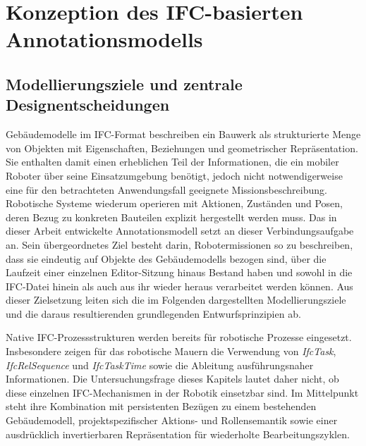 \section{Konzeption des IFC-basierten Annotationsmodells}\label{sec:ifc-annotationsmodell}
\subsection{Modellierungsziele und zentrale Designentscheidungen}\label{subsec:modellierungsziele-annotationsmodell}
Gebäudemodelle im IFC-Format beschreiben ein Bauwerk als strukturierte Menge von Objekten mit
Eigenschaften, Beziehungen und geometrischer Repräsentation. Sie enthalten damit einen erheblichen
Teil der Informationen, die ein mobiler Roboter über seine Einsatzumgebung benötigt, jedoch nicht
notwendigerweise eine für den betrachteten Anwendungsfall geeignete Missionsbeschreibung. Robotische
Systeme wiederum operieren mit Aktionen, Zuständen und Posen, deren Bezug zu konkreten Bauteilen
explizit hergestellt werden muss. Das in dieser Arbeit entwickelte Annotationsmodell setzt an dieser
Verbindungsaufgabe an. Sein übergeordnetes Ziel besteht darin, Robotermissionen
so zu beschreiben, dass sie eindeutig auf Objekte des Gebäudemodells bezogen sind, über die Laufzeit
einer einzelnen Editor-Sitzung hinaus Bestand haben und sowohl in die IFC-Datei hinein als auch aus
ihr wieder heraus verarbeitet werden können. Aus dieser Zielsetzung leiten sich die im Folgenden
dargestellten Modellierungsziele und die daraus resultierenden grundlegenden Entwurfsprinzipien ab.

Native IFC-Prozessstrukturen werden bereits für robotische Prozesse eingesetzt. Insbesondere zeigen
\textcite{slepicka2026fim} für das robotische Mauern die Verwendung von \textit{IfcTask},
\textit{IfcRelSequence} und \textit{IfcTaskTime} sowie die Ableitung ausführungsnaher Informationen.
Die Untersuchungsfrage dieses Kapitels lautet daher nicht, ob diese einzelnen IFC-Mechanismen in der
Robotik einsetzbar sind. Im Mittelpunkt steht ihre Kombination mit persistenten Bezügen zu einem
bestehenden Gebäudemodell, projektspezifischer Aktions- und Rollensemantik sowie einer ausdrücklich
invertierbaren Repräsentation für wiederholte Bearbeitungszyklen.

